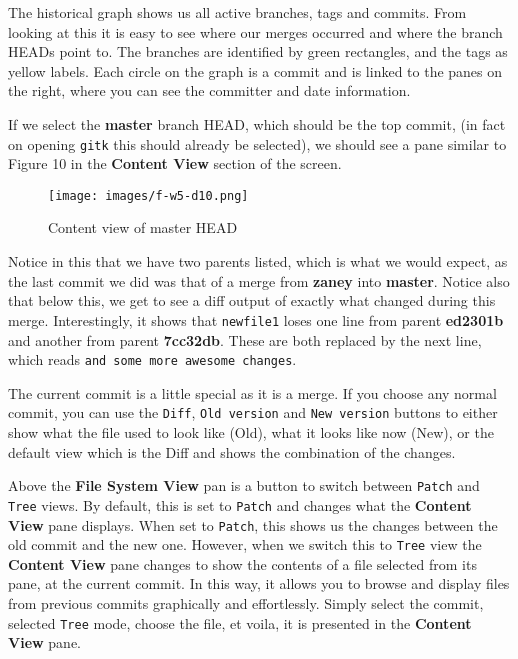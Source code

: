 The historical graph shows us all active branches, tags and commits.  From looking at this it is easy to see where our merges occurred and where the branch HEADs point to.  The branches are identified by green rectangles, and the tags as yellow labels.  Each circle on the graph is a commit and is linked to the panes on the right, where you can see the committer and date information.

If we select the \textbf{master} branch HEAD, which should be the top commit, (in fact on opening \texttt{gitk} this should already be selected), we should see a pane similar to Figure 10 in the \textbf{Content View} section of the screen.

\begin{figure}[hbt]
\centering
\texttt{[image: images/f-w5-d10.png]}
\caption{Content view of master HEAD}
\end{figure} 

Notice in this that we have two parents listed, which is what we would expect, as the last commit we did was that of a merge from \textbf{zaney} into \textbf{master}.  Notice also that below this, we get to see a diff output of exactly what changed during this merge.  Interestingly, it shows that \texttt{newfile1} loses one line from parent \textbf{ed2301b} and another from parent \textbf{7cc32db}.  These are both replaced by the next line, which reads \texttt{and some more awesome changes}.

The current commit is a little special as it is a merge.  If you choose any normal commit, you can use the \texttt{Diff}, \texttt{Old version} and \texttt{New version} buttons to either show what the file used to look like (Old), what it looks like now (New), or the default view which is the Diff and shows the combination of the changes.

Above the \textbf{File System View} pan is a button to switch between \texttt{Patch} and \texttt{Tree} views.  By default, this is set to \texttt{Patch} and changes what the \textbf{Content View} pane displays.  When set to \texttt{Patch}, this shows us the changes between the old commit and the new one.  However, when we switch this to \texttt{Tree} view the \textbf{Content View} pane changes to show the contents of a file selected from its pane, at the current commit.  In this way, it allows you to browse and display files from previous commits graphically and effortlessly.  Simply select the commit, selected \texttt{Tree} mode, choose the file, et voila, it is presented in the \textbf{Content View} pane.

